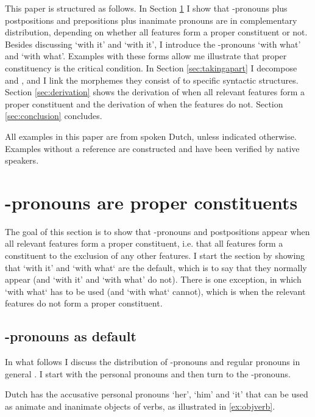 \documentclass[11pt,a4paper]{article}
\begin{document}
This paper is structured as follows. In Section \ref{sec:distribution} I show that -pronouns plus postpositions and prepositions plus inanimate pronouns are in complementary distribution, depending on whether all features form a proper constituent or not. Besides discussing  `with it' and  `with it', I introduce the -pronouns  `with what' and  `with what'. Examples with these forms allow me illustrate that proper constituency is the critical condition.
In Section \ref{sec:takingapart} I decompose  and , and I link the morphemes they consist of to specific syntactic structures. Section \ref{sec:derivation} shows the derivation of  when all relevant features form a proper constituent and the derivation of  when the features do not. Section \ref{sec:conclusion} concludes.

All examples in this paper are from spoken Dutch, unless indicated otherwise. Examples without a reference are constructed and have been verified by native speakers.


\section{-pronouns are proper constituents}\label{sec:distribution}

The goal of this section is to show that -pronouns and postpositions appear when all relevant features form a proper constituent, i.e. that all features form a constituent to the exclusion of any other features. I start the section by showing that  `with it' and  `with what` are the default, which is to say that they normally appear (and  `with it' and  `with what' do not). There is one exception, in which  `with what` has to be used (and  `with what` cannot), which is when the relevant features do not form a proper constituent.


\subsection{-pronouns as default}\label{sec:rdefault}

In what follows I discuss the distribution of -pronouns and regular pronouns in general \citep{riemsdijk1978,koopman1994}. I start with the personal pronouns and then turn to the -pronouns.

Dutch has the accusative personal pronouns  `her',  `him' and  `it' that can be used as animate and inanimate objects of verbs, as illustrated in \ref{ex:objverb}.
\end{document}
